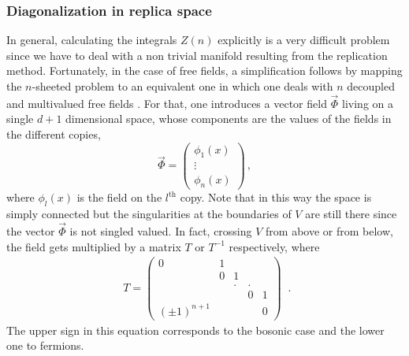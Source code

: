 \documentclass[a4paper]{article}
\begin{document}
\subsubsection{Diagonalization in replica space}
In general, calculating the integrals $Z(n)$ explicitly is a very difficult problem since we have to deal with a non trivial manifold resulting from the replication method.
Fortunately, in the case of free fields, a simplification  follows by mapping the $n$-sheeted problem to an equivalent one in which one deals with $n$ decoupled and multivalued free fields  \cite{fermion}. For that, one introduces a vector field $\vec{\Phi}$ living on a single $d+1$ dimensional space, whose components are the values of the fields in the different copies, 
\begin{equation}
\vec{\Phi}=\left(\begin{array}{c}
\phi _{1}(x)\\
\vdots \\  
\phi _{n}(x) \end{array}
\right) \,,
\end{equation}
where $\phi _{l}(x)$ is the field on the $l^{\textrm{th}}$ copy. 
Note that in this way the space is simply connected but the singularities at the boundaries of $V$ are still there since the vector $\vec{\Phi}$ is not singled valued.  In fact, crossing $V$ from above or from below, the field gets multiplied by a matrix $T$ or $T^{-1}$ respectively, where
\begin{equation}
\begin{array}{c}
T=\left(
\begin{array}{lllll}
0 & 1 &  &  &  \\
& 0 & 1 &  &  \\
&  & . & . &  \\
&  &  & 0 & 1 \\
(\pm1)^{n+1} &  &  &  & 0
\end{array}
\right)
\end{array}\,. 
\end{equation}
The upper sign in this equation corresponds to the bosonic case and the lower one to fermions. 
\end{document}
